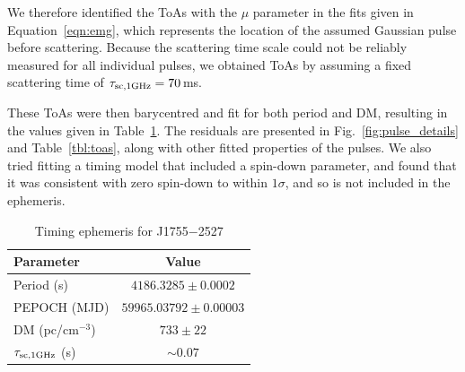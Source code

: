 \documentclass[fleqn,usenatbib]{mnras}
\newcommand{\src}{J1755$-$2527}
\newcommand{\Fig}{Fig.}
\newcommand{\Tab}{Table}
\newcommand{\Eqn}{Equation}
\begin{document}
\begin{figure}
                  \label{fig:stacked_spectra}
\end{figure}

We therefore identified the ToAs with the $\mu$ parameter in the fits given in \Eqn~\ref{eqn:emg}, which represents the location of the assumed Gaussian pulse before scattering.
Because the scattering time scale could not be reliably measured for all individual pulses, we obtained ToAs by assuming a fixed scattering time of $\tau_{\rm sc,1 GHz} = 70$\,ms.

These ToAs were then barycentred and fit for both period and DM, resulting in the values given in \Tab~\ref{tbl:ephemeris}.
The residuals are presented in \Fig~\ref{fig:pulse_details} and \Tab~\ref{tbl:toas}, along with other fitted properties of the pulses.
We also tried fitting a timing model that included a spin-down parameter, and found that it was consistent with zero spin-down to within $1\sigma$, and so is not included in the ephemeris.

\begin{table}
  \centering
  \caption{Timing ephemeris for \src{}}
  \label{tbl:ephemeris}
  \begin{tabular}{lc}
    \hline
    Parameter & Value \\
    \hline
    Period (s) & $4186.3285 \pm 0.0002$ \\
    PEPOCH (MJD) & $59965.03792 \pm 0.00003$ \\
    DM (pc/cm$^{-3}$) & $733 \pm 22$ \\
    $\tau_{\rm sc,1 GHz}$ (s) & ${\sim}0.07$ \\
    \hline
  \end{tabular}
\end{table}
\end{document}
